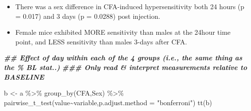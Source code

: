 \documentclass[
]{book}
\newenvironment{Shaded}{\begin{snugshade}}{\end{snugshade}}
\newcommand{\AttributeTok}[1]{\textcolor[rgb]{0.77,0.63,0.00}{#1}}
\newcommand{\DocumentationTok}[1]{\textcolor[rgb]{0.56,0.35,0.01}{\textbf{\textit{#1}}}}
\newcommand{\FunctionTok}[1]{\textcolor[rgb]{0.00,0.00,0.00}{#1}}
\newcommand{\NormalTok}[1]{#1}
\newcommand{\OtherTok}[1]{\textcolor[rgb]{0.56,0.35,0.01}{#1}}
\newcommand{\SpecialCharTok}[1]{\textcolor[rgb]{0.00,0.00,0.00}{#1}}
\newcommand{\StringTok}[1]{\textcolor[rgb]{0.31,0.60,0.02}{#1}}
\begin{document}
\begin{itemize}
\item
  There was a sex difference in CFA-induced hypersensitivity both 24 hours (p = 0.017) and 3 days (p = 0.0288) post injection.
\item
  Female mice exhibited MORE sensitivity than males at the 24hour time point, and LESS sensitivity than males 3-days after CFA.
\end{itemize}

\begin{Shaded}
\begin{Highlighting}[]
\DocumentationTok{\#\# Effect of day within each of the 4 groups (i.e., the same thing as the \% BL stat..)}
\DocumentationTok{\#\#\# Only read \& interpret measurements relative to BASELINE}

\NormalTok{b }\OtherTok{\textless{}{-}}\NormalTok{ a }\SpecialCharTok{\%\textgreater{}\%} \FunctionTok{group\_by}\NormalTok{(CFA,Sex) }\SpecialCharTok{\%\textgreater{}\%} 
  \FunctionTok{pairwise\_t\_test}\NormalTok{(value}\SpecialCharTok{\textasciitilde{}}\NormalTok{variable,}\AttributeTok{p.adjust.method =} \StringTok{"bonferroni"}\NormalTok{)}
\FunctionTok{tt}\NormalTok{(b)}
\end{Highlighting}
\end{Shaded}
\end{document}
